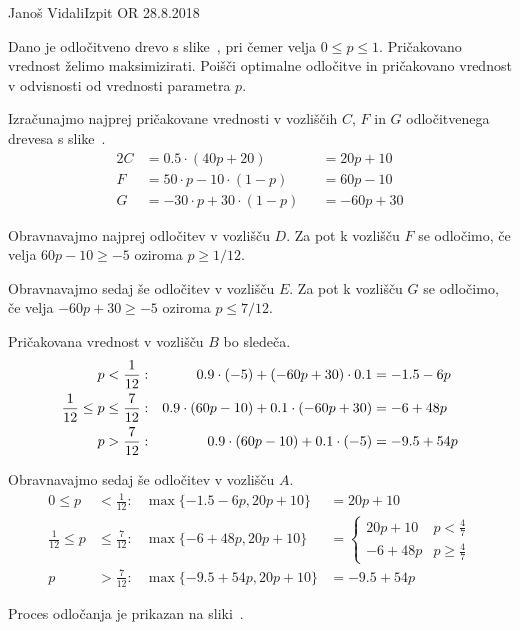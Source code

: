 \begin{naloga}{Janoš Vidali}{Izpit OR 28.8.2018}
\begin{vprasanje}
Dano je odločitveno drevo s slike~\fig,
pri čemer velja $0 \le p \le 1$.
Pričakovano vred\-nost želimo maksimizirati.
Poišči optimalne odločitve in pričakovano vrednost
v odvisnosti od vrednosti parametra $p$.

\begin{slika}
\pgfslika
{}
\end{slika}
\end{vprasanje}

\begin{odgovor}
Izračunajmo najprej pričakovane vrednosti v vozliščih $C$, $F$ in $G$
odločitvenega drevesa s slike~\fig.
\begin{alignat*}{2}
C &= 0.5 \cdot (40 p + 20) &&= 20p + 10 \\
F &= 50 \cdot p - 10 \cdot (1-p) &&= 60 p - 10 \\
G &= - 30 \cdot p + 30 \cdot (1-p) &&=  -60p + 30
\end{alignat*}

Obravnavajmo najprej odločitev v vozlišču $D$.
Za pot k vozlišču $F$ se odločimo,
če velja $60p - 10 \ge -5$ oziroma $p \ge 1/12$.

Obravnavajmo sedaj še odločitev v vozlišču $E$.
Za pot k vozlišču $G$ se odločimo,
če velja $-60p + 30 \ge -5$ oziroma $p \le 7/12$.

Pričakovana vrednost v vozlišču $B$ bo sledeča.
\begin{align*}
p &< {1 \over 12}: & 0.9 \cdot (-5) + (-60p + 30) \cdot 0.1 &= -1.5 - 6p \\
\frac{1}{12} \leq p &\le \frac{7}{12}: &
0.9 \cdot (60p - 10) + 0.1 \cdot (-60p + 30) &= -6 + 48p \\
p &> \frac{7}{12}: & 0.9 \cdot (60p - 10) + 0.1 \cdot (-5) &= -9.5 + 54 p
\end{align*}

Obravnavajmo sedaj še odločitev v vozlišču $A$.
\begin{align*}
0 \leq p &< \frac{1}{12}: & \max \{ -1.5 - 6p, 20p + 10 \} &= 20p + 10 \\
\frac{1}{12} \leq p &\le \frac{7}{12} : & \max \{ -6 + 48p, 20p + 10 \} &= 
\begin{cases}
20p + 10 & p < \frac{4}{7} \\
-6 + 48p & p \ge \frac{4}{7}
\end{cases} \\
p &> \frac{7}{12} : & \max \{ -9.5 + 54p, 20p + 10 \} &= -9.5 + 54p 
\end{align*}

Proces odločanja je prikazan na sliki~.

\begin{slika}
\end{slika}


\end{odgovor}
\end{naloga}
